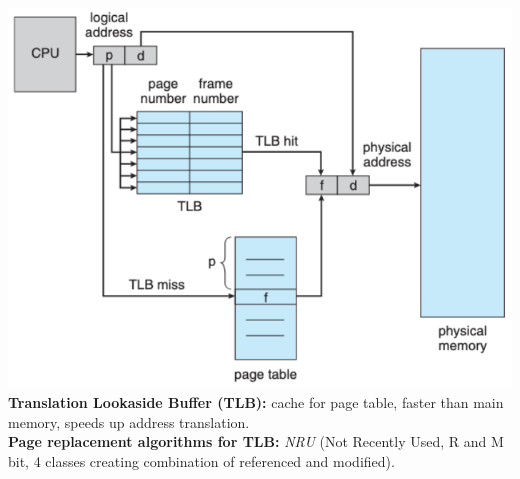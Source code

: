\includegraphics[width=0.45\linewidth]{figs/mmu-with-tlb.png}\\
\textbf{Translation Lookaside Buffer (TLB):} cache for page table, faster than main memory, speeds up address translation.\\
\textbf{Page replacement algorithms for TLB:} \textit{NRU} (Not Recently Used, R and M bit, 4 classes creating combination of referenced and modified).\\
